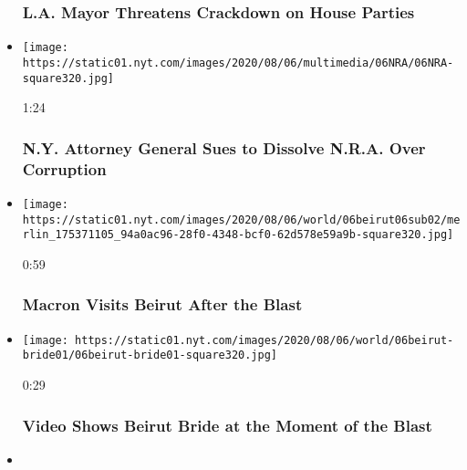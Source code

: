 \begin{itemize}
  \hypertarget{la-mayor-threatens-crackdown-on-house-parties}{%
  \subsubsection{L.A. Mayor Threatens Crackdown on House
  Parties}\label{la-mayor-threatens-crackdown-on-house-parties}}
\item
  \href{https://www.nytimes.com/video/us/politics/100000007276240/new-york-nra-lawsuit.html?action=click\&module=video-series-bar\&region=header\&pgtype=Article\&playlistId=video/latest-video}{}

  \texttt{[image: https://static01.nyt.com/images/2020/08/06/multimedia/06NRA/06NRA-square320.jpg]}

  1:24

  \hypertarget{ny-attorney-general-sues-to-dissolve-nra-over-corruption}{%
  \subsubsection{N.Y. Attorney General Sues to Dissolve N.R.A. Over
  Corruption}\label{ny-attorney-general-sues-to-dissolve-nra-over-corruption}}
\item
  \href{https://www.nytimes.com/video/world/100000007276111/beirut-lebanon-macron.html?action=click\&module=video-series-bar\&region=header\&pgtype=Article\&playlistId=video/latest-video}{}

  \texttt{[image: https://static01.nyt.com/images/2020/08/06/world/06beirut06sub02/merlin\_175371105\_94a0ac96-28f0-4348-bcf0-62d578e59a9b-square320.jpg]}

  0:59

  \hypertarget{macron-visits-beirut-after-the-blast}{%
  \subsubsection{Macron Visits Beirut After the
  Blast}\label{macron-visits-beirut-after-the-blast}}
\item
  \href{https://www.nytimes.com/video/world/middleeast/100000007275939/beirut-bride-lebanon.html?action=click\&module=video-series-bar\&region=header\&pgtype=Article\&playlistId=video/latest-video}{}

  \texttt{[image: https://static01.nyt.com/images/2020/08/06/world/06beirut-bride01/06beirut-bride01-square320.jpg]}

  0:29

  \hypertarget{video-shows-beirut-bride-at-the-moment-of-the-blast}{%
  \subsubsection{Video Shows Beirut Bride at the Moment of the
  Blast}\label{video-shows-beirut-bride-at-the-moment-of-the-blast}}
\item
  \href{https://www.nytimes.com/video/us/100000007274897/arizona-covid-improvments-shutting-down.html?action=click\&module=video-series-bar\&region=header\&pgtype=Article\&playlistId=video/latest-video}{}


\end{itemize}
